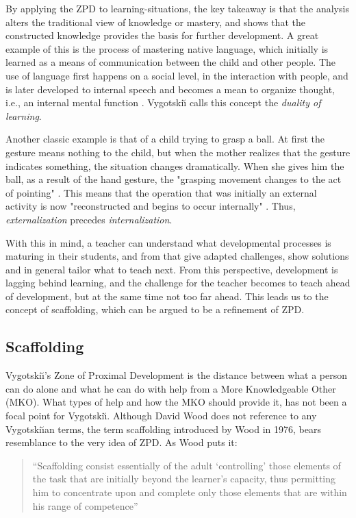 By applying the ZPD to learning-situations, the key takeaway is that the analysis alters the traditional view of knowledge or mastery, and shows that the constructed knowledge provides the basis for further development. A great example of this is the process of mastering native language, which initially is learned as a means of communication between the child and other people. The use of language first happens on a social level, in the interaction with people, and is later developed to internal speech and becomes a mean to organize thought, i.e., an internal mental function \citep[p. 89]{vygotskiui1978mind}. Vygotski{\u\i} calls this concept the \textit{duality of learning}. 

Another classic example is that of a child trying to grasp a ball. At first the gesture means nothing to the child, but when the mother realizes that the gesture indicates something, the situation changes dramatically. When she gives him the ball, as a result of the hand gesture, the "grasping movement changes to the act of pointing" \citep{vygotskiui1978mind}. This means that the operation that was initially an external activity is now "reconstructed and begins to occur internally" \citep{vygotskiui1978mind}. Thus, \textit{externalization} precedes \textit{internalization}. 

With this in mind, a teacher can understand what developmental processes is maturing in their students, and from that give adapted challenges, show solutions and in general tailor what to teach next. From this perspective, development is lagging behind learning, and the challenge for the teacher becomes to teach ahead of development, but at the same time not too far ahead. This leads us to the concept of scaffolding, which can be argued to be a refinement of ZPD.

\subsection{Scaffolding}
Vygotski{\u\i}'s Zone of Proximal Development is the distance between what a person can do alone and what he can do with help from a More Knowledgeable Other (MKO). What types of help and how the MKO should provide it, has not been a focal point for Vygotski{\u\i}. Although David Wood does not reference to any Vygotski{\u\i}an terms, the term scaffolding introduced by Wood in 1976, bears resemblance to the very idea of ZPD. As Wood puts it:

\begin{quote}“Scaffolding consist essentially of the adult ‘controlling’ those elements of the task that are initially beyond the learner’s capacity, thus permitting him to concentrate upon and complete only those elements that are within his range of competence” \citep{wood1976role}
\end{quote}

